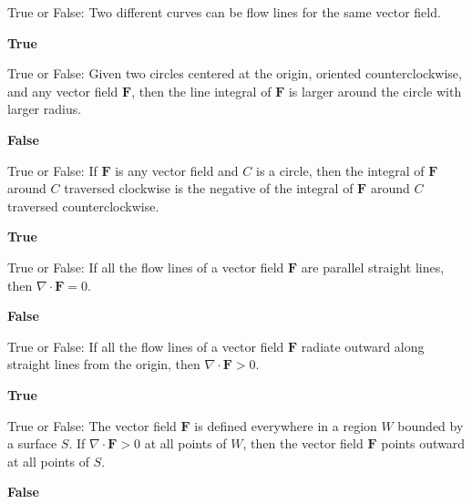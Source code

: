 \documentclass{exam}
\newcommand{\br}{\mathbf{r}}
\newcommand{\bF}{\mathbf{F}}
\begin{document}
\begin{questions}
		\question True or False: Two different curves can be flow lines for the same vector field.
		 \begin{solution}
		 	\textbf{True}
		 \end{solution}
		

		

		

			

		\question True or False: Given two circles centered at the origin, oriented counterclockwise, and any vector field $\bF$, then the line integral of $\bF$ is larger around the circle with larger radius.
		 \begin{solution}
		 	\textbf{False}
		 \end{solution}
		
		\question True or False: If $\bF$ is any vector field and $C$ is a circle, then the integral of $\bF$ around $C$ traversed clockwise is the negative of the integral of $\bF$ around $C$ traversed counterclockwise.
		 \begin{solution}
		 	\textbf{True}
		 \end{solution}
		
		\question True or False: If all the flow lines of a vector field $\bF$ are parallel straight lines, then $\nabla\cdot\bF = 0.$
		 \begin{solution}
		 	\textbf{False}
		 \end{solution}
		
		\question True or False: If all the flow lines of a vector field $\bF$ radiate outward along straight lines from the origin, then $\nabla \cdot \bF > 0$.
		 \begin{solution}
		 	\textbf{True}
		 \end{solution}
		
		\question True or False: The vector field $\bF$ is defined everywhere in a region $W$ bounded by a surface $S$. If $\nabla \cdot \bF > 0$ at all points of $W$, then the vector field $\bF$ points outward at all points of $S$.
		 \begin{solution}
		 	\textbf{False}
		 \end{solution}
		

\end{questions}
\end{document}
